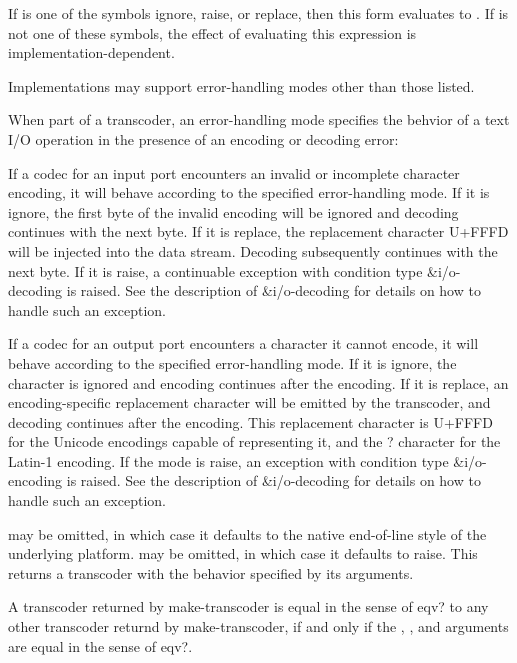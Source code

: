 \begin{entry}{%
}

If  is one of the symbols {\cf ignore}, {\cf raise}, or {\cf
  replace}, then this form evaluates to .  If  is
not one of these symbols, the effect of evaluating this expression is
implementation-dependent.

\begin{rationale}
  Implementations may support error-handling modes other than those
  listed.
\end{rationale}

When part of a transcoder, an error-handling mode specifies the behvior
of a text I/O operation in the presence of an encoding or decoding
error:

If a codec for an input port encounters an invalid or incomplete
character encoding, it will behave according to the specified
error-handling mode. If it is {\cf ignore}, the first byte of the
invalid encoding will be ignored and decoding continues with the next
byte.  If it is {\cf replace}, the replacement character U+FFFD will
be injected into the data stream.  Decoding subsequently continues
with the next byte. If it is {\cf raise}, a continuable exception with
condition type {\cf\&i/o-decoding} is raised.  See the description of
{\cf\&i/o-decoding} for details
on how to handle such an exception.

If a codec for an output port encounters a character it cannot encode,
it will behave according to the specified error-handling mode. If it
is {\cf ignore}, the character is ignored and encoding continues after
the encoding. If it is {\cf replace}, an encoding-specific replacement
character will be emitted by the transcoder, and decoding continues
after the encoding. This replacement character is U+FFFD for the
Unicode encodings capable of representing it, and the {\cf ?}
character for the Latin-1 encoding. If the mode is {\cf raise}, an
exception with condition type {\cf\&i/o-encoding} is raised.
See the description of
{\cf\&i/o-decoding} for details
on how to handle such an exception.
\end{entry}

\begin{entry}{%
}

   may be omitted, in
which case it defaults to the native end-of-line style of the
underlying platform.   may be omitted, in which
case it defaults to {\cf raise}.  This returns a transcoder with the
behavior specified by its arguments.

A transcoder returned by {\cf make-transcoder} is equal in the sense
of {\cf eqv?} to any other transcoder returnd by {\cf
  make-transcoder}, if and only if the , ,
and  arguments are equal in the sense of {\cf
  eqv?}.
\end{entry}

